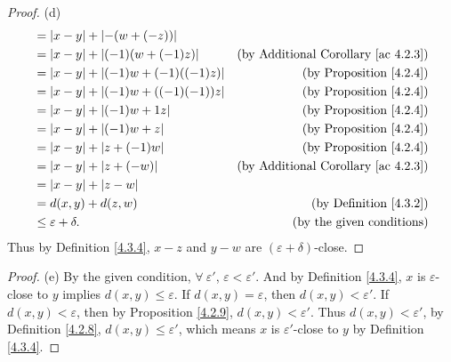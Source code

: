\begin{proof}{(d)}
\begin{align*}
&= \abs*{x - y} + \abs*{-(w + (-z))} \\
&= \abs*{x - y} + \abs*{(-1)(w + (-1)z)} & \text{(by Additional Corollary \ref{ac 4.2.3})} \\
&= \abs*{x - y} + \abs*{(-1)w + (-1)((-1)z)} & \text{(by Proposition \ref{4.2.4})} \\
&= \abs*{x - y} + \abs*{(-1)w + ((-1)(-1))z} & \text{(by Proposition \ref{4.2.4})} \\
&= \abs*{x - y} + \abs*{(-1)w + 1z} & \text{(by Proposition \ref{4.2.4})} \\
&= \abs*{x - y} + \abs*{(-1)w + z} & \text{(by Proposition \ref{4.2.4})} \\
&= \abs*{x - y} + \abs*{z + (-1)w} & \text{(by Proposition \ref{4.2.4})} \\
&= \abs*{x - y} + \abs*{z + (-w)} & \text{(by Additional Corollary \ref{ac 4.2.3})} \\
&= \abs*{x - y} + \abs*{z - w} \\
&= d(x, y) + d(z, w) & \text{(by Definition \ref{4.3.2})} \\
&\leq \varepsilon + \delta. & \text{(by the given conditions)}
\end{align*}
Thus by Definition \ref{4.3.4}, \(x - z\) and \(y - w\) are \((\varepsilon + \delta)\)-close.
\end{proof}

\begin{proof}{(e)}
By the given condition, \(\forall\ \varepsilon'\), \(\varepsilon < \varepsilon'\).
And by Definition \ref{4.3.4}, \(x\) is \(\varepsilon\)-close to \(y\) implies \(d(x, y) \leq \varepsilon\).
If \(d(x, y) = \varepsilon\), then \(d(x, y) < \varepsilon'\).
If \(d(x, y) < \varepsilon\), then by Proposition \ref{4.2.9}, \(d(x, y) < \varepsilon'\).
Thus \(d(x, y) < \varepsilon'\), by Definition \ref{4.2.8}, \(d(x, y) \leq \varepsilon'\), which means \(x\) is \(\varepsilon'\)-close to \(y\) by Definition \ref{4.3.4}.
\end{proof}

